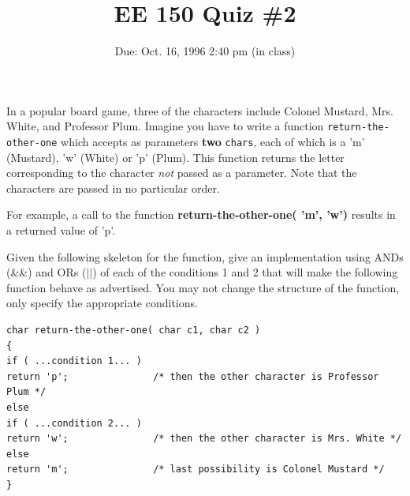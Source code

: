 \setcounter{page}{1}



\title{EE 150 Quiz \#2}
\author{Due: Oct. 16, 1996 2:40 pm (in class)}
\date{}
\maketitle

In a popular board game, three of the characters include Colonel
Mustard, Mrs. White, and Professor Plum.  Imagine you have to write a
function {\tt return-the-other-one} which accepts as parameters {\bf two}
{\tt chars}, each of which is a 'm' (Mustard), 'w' (White) or 'p'
(Plum).  This function returns the letter corresponding to the
character {\em not} passed as a parameter.  Note that the characters
are passed in no particular order.

For example, a call to the function {\bf return-the-other-one( 'm',
'w')} results in a returned value of 'p'.  

Given the following skeleton for the function, give an implementation
using ANDs (\&\&) and ORs ($||$) of each of the conditions 1 and 2
that will make the following function behave as advertised.  You may
not change the structure of the function, only specify the appropriate
conditions. 
\begin{verbatim}
char return-the-other-one( char c1, char c2 )
{
if ( ...condition 1... )
return 'p';               /* then the other character is Professor Plum */
else
if ( ...condition 2... )
return 'w';               /* then the other character is Mrs. White */
else
return 'm';               /* last possibility is Colonel Mustard */  
}
\end{verbatim}


